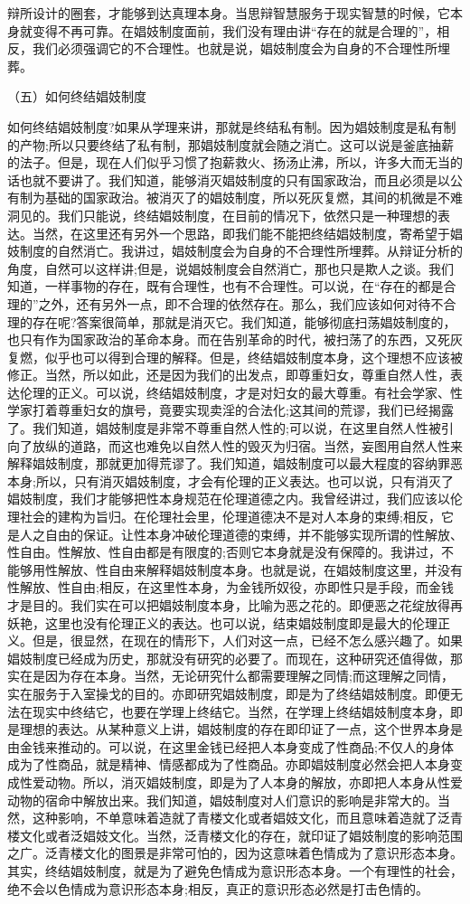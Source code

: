 \documentclass[
    a4paper
    ]{article}
\begin{document}
辩所设计的圈套，才能够到达真理本身。当思辩智慧服务于现实智慧的时候，它本身就变得不再可靠。在娼妓制度面前，我们没有理由讲“存在的就是合理的”，相反，我们必须强调它的不合理性。也就是说，娼妓制度会为自身的不合理性所埋葬。　

（五）如何终结娼妓制度

如何终结娼妓制度?如果从学理来讲，那就是终结私有制。因为娼妓制度是私有制的产物;所以只要终结了私有制，那娼妓制度就会随之消亡。这可以说是釜底抽薪的法子。但是，现在人们似乎习惯了抱薪救火、扬汤止沸，所以，许多大而无当的话也就不要讲了。我们知道，能够消灭娼妓制度的只有国家政治，而且必须是以公有制为基础的国家政治。被消灭了的娼妓制度，所以死灰复燃，其间的机微是不难洞见的。我们只能说，终结娼妓制度，在目前的情况下，依然只是一种理想的表达。当然，在这里还有另外一个思路，即我们能不能把终结娼妓制度，寄希望于娼妓制度的自然消亡。我讲过，娼妓制度会为自身的不合理性所埋葬。从辩证分析的角度，自然可以这样讲;但是，说娼妓制度会自然消亡，那也只是欺人之谈。我们知道，一样事物的存在，既有合理性，也有不合理性。可以说，在“存在的都是合理的”之外，还有另外一点，即不合理的依然存在。那么，我们应该如何对待不合理的存在呢?答案很简单，那就是消灭它。我们知道，能够彻底扫荡娼妓制度的，也只有作为国家政治的革命本身。而在告别革命的时代，被扫荡了的东西，又死灰复燃，似乎也可以得到合理的解释。但是，终结娼妓制度本身，这个理想不应该被修正。当然，所以如此，还是因为我们的出发点，即尊重妇女，尊重自然人性，表达伦理的正义。可以说，终结娼妓制度，才是对妇女的最大尊重。有社会学家、性学家打着尊重妇女的旗号，竟要实现卖淫的合法化;这其间的荒谬，我们已经揭露了。我们知道，娼妓制度是非常不尊重自然人性的;可以说，在这里自然人性被引向了放纵的道路，而这也难免以自然人性的毁灭为归宿。当然，妄图用自然人性来解释娼妓制度，那就更加得荒谬了。我们知道，娼妓制度可以最大程度的容纳罪恶本身;所以，只有消灭娼妓制度，才会有伦理的正义表达。也可以说，只有消灭了娼妓制度，我们才能够把性本身规范在伦理道德之内。我曾经讲过，我们应该以伦理社会的建构为旨归。在伦理社会里，伦理道德决不是对人本身的束缚;相反，它是人之自由的保证。让性本身冲破伦理道德的束缚，并不能够实现所谓的性解放、性自由。性解放、性自由都是有限度的;否则它本身就是没有保障的。我讲过，不能够用性解放、性自由来解释娼妓制度本身。也就是说，在娼妓制度这里，并没有性解放、性自由;相反，在这里性本身，为金钱所奴役，亦即性只是手段，而金钱才是目的。我们实在可以把娼妓制度本身，比喻为恶之花的。即便恶之花绽放得再妖艳，这里也没有伦理正义的表达。也可以说，结束娼妓制度即是最大的伦理正义。但是，很显然，在现在的情形下，人们对这一点，已经不怎么感兴趣了。如果娼妓制度已经成为历史，那就没有研究的必要了。而现在，这种研究还值得做，那实在是因为存在本身。当然，无论研究什么都需要理解之同情;而这理解之同情，实在服务于入室操戈的目的。亦即研究娼妓制度，即是为了终结娼妓制度。即便无法在现实中终结它，也要在学理上终结它。当然，在学理上终结娼妓制度本身，即是理想的表达。从某种意义上讲，娼妓制度的存在即印证了一点，这个世界本身是由金钱来推动的。可以说，在这里金钱已经把人本身变成了性商品;不仅人的身体成为了性商品，就是精神、情感都成为了性商品。亦即娼妓制度必然会把人本身变成性爱动物。所以，消灭娼妓制度，即是为了人本身的解放，亦即把人本身从性爱动物的宿命中解放出来。我们知道，娼妓制度对人们意识的影响是非常大的。当然，这种影响，不单意味着造就了青楼文化或者娼妓文化，而且意味着造就了泛青楼文化或者泛娼妓文化。当然，泛青楼文化的存在，就印证了娼妓制度的影响范围之广。泛青楼文化的图景是非常可怕的，因为这意味着色情成为了意识形态本身。其实，终结娼妓制度，就是为了避免色情成为意识形态本身。一个有理性的社会，绝不会以色情成为意识形态本身;相反，真正的意识形态必然是打击色情的。
\end{document}
